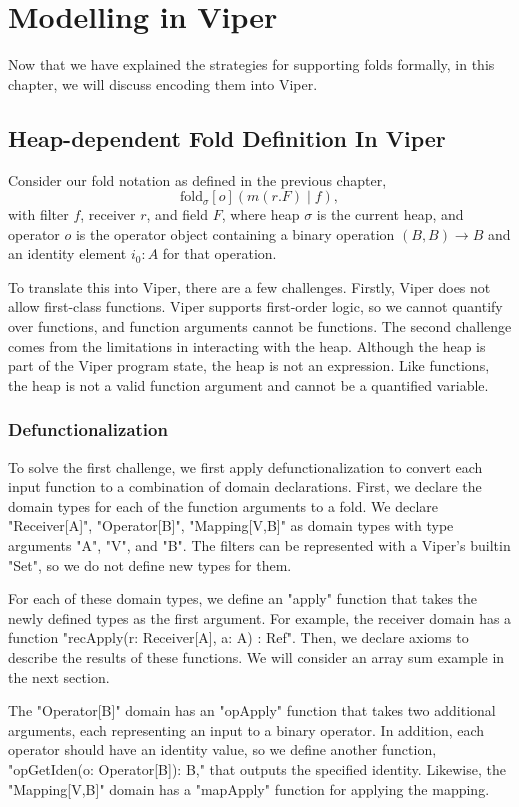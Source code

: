 \documentclass[msc,oneside]{ubcthesis}
\begin{document}
\chapter{Modelling in Viper}
Now that we have explained the strategies for supporting folds formally, in this chapter, we will discuss encoding them into Viper.

\section{Heap-dependent Fold Definition In Viper}
Consider our fold notation as defined in the previous chapter, 
$$\textrm{fold}_{\sigma}[o]( m(r.F) \mid f),$$
with filter $f$, receiver $r$, and field $F$, where heap $\sigma$ is the current heap, and operator $o$ is the operator object containing a binary operation $(B, B) \rightarrow B$ and an identity element $i_0 : A$ for that operation.

To translate this into Viper, there are a few challenges. Firstly, Viper does not allow first-class functions. Viper supports first-order logic, so we cannot quantify over functions, and function arguments cannot be functions. The second challenge comes from the limitations in interacting with the heap. Although the heap is part of the Viper program state, the heap is not an expression. Like functions, the heap is not a valid function argument and cannot be a quantified variable. 

\subsection{Defunctionalization}
To solve the first challenge, we first apply defunctionalization to convert each input function to a combination of domain declarations. First, we declare the domain types for each of the function arguments to a fold. We declare "Receiver[A]", "Operator[B]", "Mapping[V,B]" as domain types with type arguments "A", "V", and "B". The filters can be represented with a Viper's builtin "Set", so we do not define new types for them.

For each of these domain types, we define an "apply" function that takes the newly defined types as the first argument. For example, the receiver domain has a function "recApply(r: Receiver[A], a: A) : Ref". Then, we declare axioms to describe the results of these functions. We will consider an array sum example in the next section.

The "Operator[B]" domain has an "opApply" function that takes two additional arguments, each representing an input to a binary operator. In addition, each operator should have an identity value, so we define another function, "opGetIden(o: Operator[B]): B," that outputs the specified identity. Likewise, the "Mapping[V,B]" domain has a "mapApply" function for applying the mapping.
\end{document}

